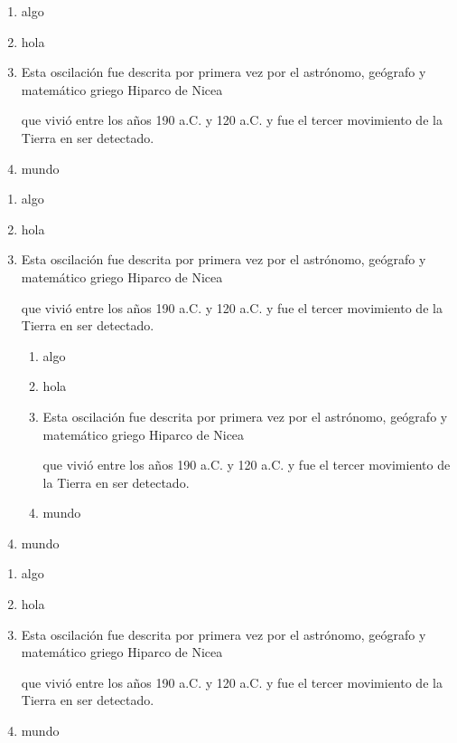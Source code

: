\documentclass{report}
\theoremstyle{definition}
\theoremstyle{remark}
\begin{document}
\begin{enumerate}
	\item algo 
	\item hola
	\item Esta oscilación fue descrita por primera vez por el astrónomo, geógrafo y matemático griego Hiparco de Nicea 
	
	que vivió entre los años 190 a.C. y 120 a.C. y fue el tercer movimiento de la Tierra en ser detectado.
	
	\item mundo
	
\end{enumerate}
	
	
\begin{enumerate}
	\item algo 
	\item hola
	\item Esta oscilación fue descrita por primera vez por el astrónomo, geógrafo y matemático griego Hiparco de Nicea 
	
	que vivió entre los años 190 a.C. y 120 a.C. y fue el tercer movimiento de la Tierra en ser detectado.
\begin{enumerate}
	\item algo 
	\item hola
	\item Esta oscilación fue descrita por primera vez por el astrónomo, geógrafo y matemático griego Hiparco de Nicea 
	
	que vivió entre los años 190 a.C. y 120 a.C. y fue el tercer movimiento de la Tierra en ser detectado.
	
	\item mundo
	
\end{enumerate}
	
	\item mundo
	
\end{enumerate}


\begin{enumerate}
	\item algo 
	\item hola
	\item Esta oscilación fue descrita por primera vez por el astrónomo, geógrafo y matemático griego Hiparco de Nicea 
	
	que vivió entre los años 190 a.C. y 120 a.C. y fue el tercer movimiento de la Tierra en ser detectado.
	
	\item mundo
	
\end{enumerate}
	
\end{document}
